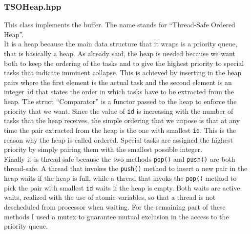 \documentclass[12pt]{article}
\begin{document}
\subsubsection{TSOHeap.hpp}
This class implements the buffer. The name stands for ``Thread-Safe Ordered Heap''. \\
It is a heap because the main data structure that it wraps is a priority queue, that is basically a heap. As already said, the heap is needed because we want both to keep the ordering of the tasks and to give the highest priority to special tasks that indicate imminent collapse. This is achieved by inserting in the heap pairs where the first element is the actual task and the second element is an integer \texttt{id} that states the order in which tasks have to be extracted from the heap. The struct ``Comparator'' is a functor passed to the heap to enforce the priority that we want. Since the value of \texttt{id} is increasing with the number of tasks that the heap receives, the simple ordering that we impose is that at any time the pair extracted from the heap is the one with smallest \texttt{id}. This is the reason why the heap is called ordered. Special tasks are assigned the highest priority by simply pairing them with the smallest possible integer. \\
Finally it is thread-safe because the two methods  \texttt{pop()} and \texttt{push()} are both thread-safe. A thread that invokes the \texttt{push()} method to insert a new pair in the heap waits if the heap is full, while a thread that invoks the \texttt{pop()} method to pick the pair with smallest \texttt{id} waits if the heap is empty. Both waits are active waits, realized with the use of atomic variables, so that a thread is not descheduled from processor when waiting. For the remaining part of these methods I used a mutex to guarantee mutual exclusion in the access to the priority queue.
     
\end{document}
